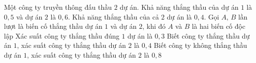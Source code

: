 \begin{ex}%
	Một công ty truyền thông đấu thầu $2$ dự án. Khả năng thắng thầu của dự án $1$ là $0{,}5$ và dự án $2$ là $0{,}6$. Khả năng thắng thầu của cả $2$ dự án là $0{,}4$. Gọi $A$, $B$ lần lượt là biến cố thắng thầu dự án $1$ và dự án $2$, khi đó
	\choiceTF
	{$A$ và $B$ là hai biến cố độc lập}
	{\True Xác suất công ty thắng thầu đúng $1$ dự án là $0{,}3$}
	{Biết công ty thắng thầu dự án $1$, xác suất công ty thắng thầu dự án $2$ là $0{,}4$}
	{Biết công ty không thắng thầu dự án $1$, xác suất công ty thắng thầu dự án $2$ là $0{,}8$}
\end{ex}

